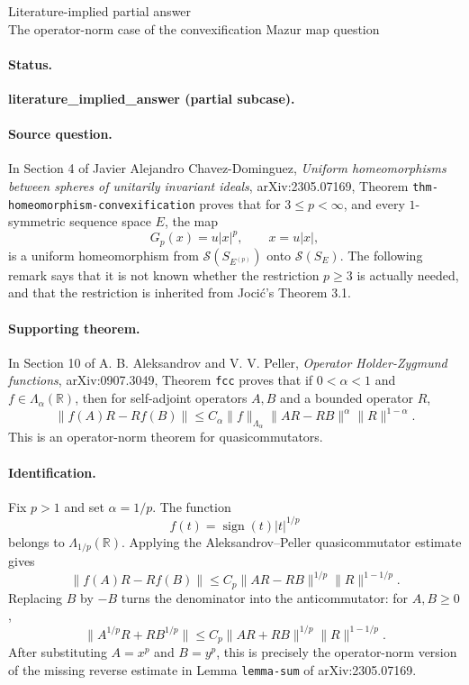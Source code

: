 \documentclass[11pt]{article}
\newcommand{\Sph}{\mathscr S}
\begin{document}
\begin{center}
{\Large Literature-implied partial answer}\\[3pt]
{\large The operator-norm case of the convexification Mazur map question}
\end{center}

\paragraph{Status.}
\textbf{literature\_implied\_answer (partial subcase).}

\paragraph{Source question.}
In Section 4 of Javier Alejandro Chavez-Dominguez,
\emph{Uniform homeomorphisms between spheres of unitarily invariant ideals},
arXiv:2305.07169, Theorem \texttt{thm-homeomorphism-convexification}
proves that for \(3\le p<\infty\), and every \(1\)-symmetric sequence
space \(E\), the map
\[
G_p(x)=u|x|^p,\qquad x=u|x|,
\]
is a uniform homeomorphism from \(\Sph(S_{E^{(p)}})\) onto
\(\Sph(S_E)\).  The following remark says that it is not known whether
the restriction \(p\ge 3\) is actually needed, and that the restriction is
inherited from Jocić's Theorem 3.1.

\paragraph{Supporting theorem.}
In Section 10 of A. B. Aleksandrov and V. V. Peller,
\emph{Operator Holder-Zygmund functions}, arXiv:0907.3049, Theorem
\texttt{fcc} proves that if \(0<\alpha<1\) and \(f\in\Lambda_\alpha(\mathbb R)\),
then for self-adjoint operators \(A,B\) and a bounded operator \(R\),
\[
\|f(A)R-Rf(B)\|
 \le C_\alpha \|f\|_{\Lambda_\alpha}
       \|AR-RB\|^\alpha \|R\|^{1-\alpha}.
\]
This is an operator-norm theorem for quasicommutators.

\paragraph{Identification.}
Fix \(p>1\) and set \(\alpha=1/p\).  The function
\[
f(t)=\operatorname{sign}(t)|t|^{1/p}
\]
belongs to \(\Lambda_{1/p}(\mathbb R)\).  Applying the Aleksandrov--Peller
quasicommutator estimate gives
\[
\|f(A)R-Rf(B)\|
 \le C_p\|AR-RB\|^{1/p}\|R\|^{1-1/p}.
\]
Replacing \(B\) by \(-B\) turns the denominator into the anticommutator:
for \(A,B\ge0\),
\[
\|A^{1/p}R+RB^{1/p}\|
 \le C_p\|AR+RB\|^{1/p}\|R\|^{1-1/p}.
\]
After substituting \(A=x^p\) and \(B=y^p\), this is precisely the
operator-norm version of the missing reverse estimate in Lemma
\texttt{lemma-sum} of arXiv:2305.07169.
\end{document}
